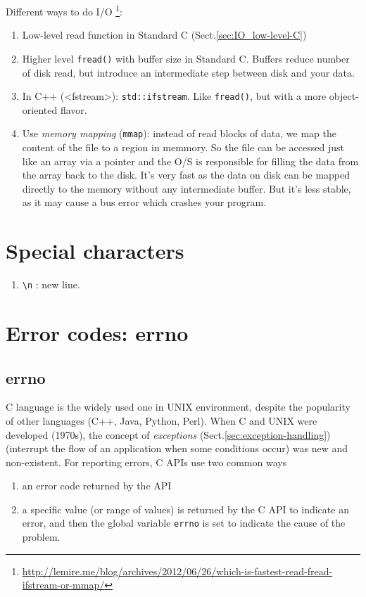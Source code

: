 Different ways to do I/O
\footnote{\url{http://lemire.me/blog/archives/2012/06/26/which-is-fastest-read-fread-ifstream-or-mmap/}}:
\begin{enumerate}
  \item Low-level read function in Standard C (Sect.\ref{sec:IO_low-level-C})
  
  \item Higher level \verb!fread()! with buffer size in Standard C. Buffers
  reduce number of disk read, but introduce an intermediate step between disk
  and your data.
   
  \item In C++ (<fstream>): \verb!std::ifstream!. Like \verb!fread()!, but with
  a more object-oriented flavor. 
  \item Use {\it memory mapping} (\verb!mmap!): instead of read blocks of data,
  we map the content of the file to a region in memmory. So the file can be
  accessed just like an array via a pointer and the O/S is responsible for
  filling the data from the array back to the disk. It's very fast as the data
  on disk can be mapped directly to the memory without any intermediate buffer.
  But it's  less stable, as it may cause a bus error which crashes your program. 
\end{enumerate}


\section{Special characters}

\begin{enumerate}
  \item \verb!\n! : new line. 
  
\end{enumerate}

\section{Error codes: errno}

\subsection{errno}
\label{sec:error_code}

C language is the widely used one in UNIX environment, despite the popularity of
other languages (C++, Java, Python, Perl). When C and UNIX were developed
(1970s), the concept of {\it exceptions} (Sect.\ref{sec:exception-handling}) (interrupt
the flow of an application when some conditions occur) was new and non-existent.
For reporting errors, C APIs use two common ways
\begin{enumerate}
  \item an error code returned by the API
  \item a specific value (or range of values) is returned by the C API to
  indicate an error, and then the global variable \verb!errno! is set to
  indicate the cause of the problem.
\end{enumerate}

